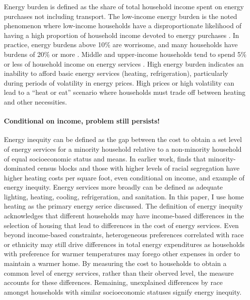 \documentclass[
]{article}
\begin{document}
Energy burden is defined as the share of total household income spent on energy purchases not including transport. The low-income
energy burden is the noted phenomenon where low-income households have a disproportionate likelihood of having a high proportion
of household income devoted to energy purchases \cite{Byrne1986, Baxter1998}. In practice, energy burdens above 10\% are worrisome,
and many households have burdens of 20\% or more \cite{Baxter1998}. Middle and upper-income households tend to spend 5\% or less of
household income on energy services \cite{Hernandez2010}. High energy burden indicates an inability to afford
basic energy services (heating, refrigeration), particularly during periods of volatility in energy prices. High prices
or high volatility can lead to a ``heat or eat'' scenario \cite{HeatOrEat2003} where households must trade
off between heating and other necessities.

\hypertarget{conditional-on-income-problem-still-persists}{%
\paragraph{Conditional on income, problem still persists!}\label{conditional-on-income-problem-still-persists}}

Energy inequity can be defined as the gap between the cost to obtain a set level of energy services for a minority household
relative to a non-minority household of equal socioeconomic status and means. In earlier work, \cite{Reames2016} finds that minority-dominated census blocks and those with higher levels of racial segregation have higher heating costs per square foot, even conditional on income, and example of energy inequity. Energy services more broadly can be defined as
adequate lighting, heating, cooling, refrigeration, and sanitation. In this paper, I use home heating as the primary
energy serice discussed. The definition of energy inequity acknowledges that different households may have income-based differences in the selection of housing that lead to differences in the cost of energy services. Even beyond income-based constraints, heterogeneous preferences correlated
with race or ethnicity may still drive differences in total energy expenditures as households with preference for
warmer temperatures may forego other expenses in order to maintain a warmer home. By measuring the cost
to households to obtain a common level of energy services, rather than their oberved level, the measure accounts for these differences. Remaining, unexplained differences by race amongst households with similar socioeconomic statuses signify energy inequity.
\end{document}
